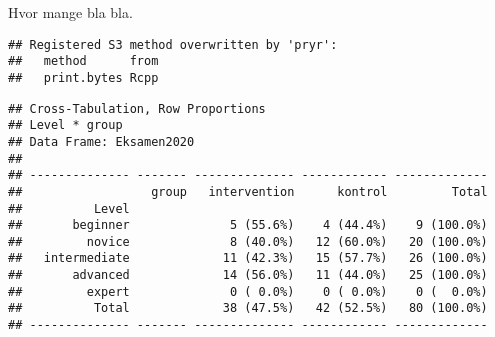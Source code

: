 \documentclass[
]{article}
\newenvironment{Shaded}{\begin{snugshade}}{\end{snugshade}}
\newcommand{\FunctionTok}[1]{\textcolor[rgb]{0.00,0.00,0.00}{#1}}
\newcommand{\NormalTok}[1]{#1}
\newcommand{\SpecialCharTok}[1]{\textcolor[rgb]{0.00,0.00,0.00}{#1}}
\begin{document}
Hvor mange bla bla.

\begin{Shaded}
\end{Shaded}

\begin{verbatim}
## Registered S3 method overwritten by 'pryr':
##   method      from
##   print.bytes Rcpp
\end{verbatim}

\begin{verbatim}
## Cross-Tabulation, Row Proportions  
## Level * group  
## Data Frame: Eksamen2020  
## 
## -------------- ------- -------------- ------------ -------------
##                  group   intervention      kontrol         Total
##          Level                                                  
##       beginner              5 (55.6%)    4 (44.4%)    9 (100.0%)
##         novice              8 (40.0%)   12 (60.0%)   20 (100.0%)
##   intermediate             11 (42.3%)   15 (57.7%)   26 (100.0%)
##       advanced             14 (56.0%)   11 (44.0%)   25 (100.0%)
##         expert              0 ( 0.0%)    0 ( 0.0%)    0 (  0.0%)
##          Total             38 (47.5%)   42 (52.5%)   80 (100.0%)
## -------------- ------- -------------- ------------ -------------
\end{verbatim}
\end{document}
